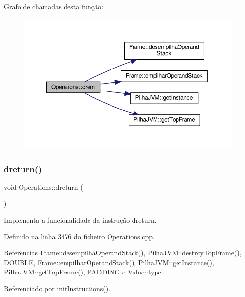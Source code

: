 Grafo de chamadas desta função\+:
\nopagebreak
\begin{figure}[H]
\begin{center}
\leavevmode
\includegraphics[width=350pt]{classOperations_abe333415749dbd2331ce89dc5e2233c5_cgraph}
\end{center}
\end{figure}
\mbox{\label{classOperations_a85ce8267820ffcc1e1530d533545c9f3}} 
\subsubsection{\texorpdfstring{dreturn()}{dreturn()}}
{\footnotesize\ttfamily void Operations\+::dreturn (\begin{DoxyParamCaption}{ }\end{DoxyParamCaption})\hspace{0.3cm}{\ttfamily [private]}}



Implementa a funcionalidade da instrução dreturn. 



Definido na linha 3476 do ficheiro Operations.\+cpp.



Referências Frame\+::desempilha\+Operand\+Stack(), Pilha\+J\+V\+M\+::destroy\+Top\+Frame(), D\+O\+U\+B\+LE, Frame\+::empilhar\+Operand\+Stack(), Pilha\+J\+V\+M\+::get\+Instance(), Pilha\+J\+V\+M\+::get\+Top\+Frame(), P\+A\+D\+D\+I\+NG e Value\+::type.



Referenciado por init\+Instructions().

